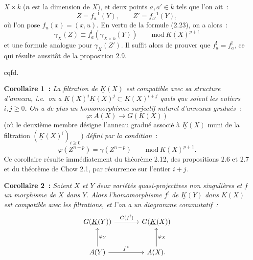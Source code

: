 $X\times k$ ($n$ est la
dimension de $X$), et deux points $a,a'\in k$ tels que l'on ait~:
\[
 Z=f_a^{-1}(Y),\qquad Z'=f_{a'}^{-1}(Y),
\]
où l'on pose $f_u(x)=(x,u)$. En vertu de la formule (2.23), on a alors~:
\[
 \gamma_X(Z)\equiv f_a^!(\gamma_{X\times k}(Y))\qquad\mathrm{mod}\ \underline K(X)^{p+1}
\]
et une formule analogue pour $\gamma_X(Z')$. Il suffit alors de prouver que $f_a^!=f_a^!$, ce qui résulte aussitôt de la proposition 2.9.
\begin{flushright}cqfd.\end{flushright}

\textbf{Corollaire 1~:} \emph{La filtration de $\underline K(X)$ est compatible avec sa structure d'anneau, i.e.\ on a $\underline K(X)^i\underline K(X)^j\subset\underline K(X)^{i+j}$ quels que soient les entiers $i,j\geq0$. On a de plus un homomorphisme surjectif naturel d'anneaux gradués~:}
\begin{equation}\tag{2.34}
 \varphi:A(X)\longrightarrow G(K(X))
\end{equation}
(où le deuxième membre désigne l'anneau gradué associé à $\underline K(X)$ muni de la filtration $(\underline K(X)^i)_{i\geq0}$) \emph{défini par la condition}~:
\[
 \varphi(Z^{n-p})=\gamma(Z^{n-p})\qquad\mathrm{mod}\ \underline K(X)^{p+1}.
\]
Ce corollaire résulte immédiatement du théorème 2.12, des propositions 2.6 et 2.7 et du théorème de Chow 2.1, par récurrence sur l'entier $i+j$.

\textbf{Corollaire 2~:} \emph{Soient $X$ et $Y$ deux variétés quasi-projectives non singulières et $f$ un morphisme de $X$ dans $Y$. Alors l'homomorphisme $f^!$ de $\underline K(Y)$ dans $K(X)$ est compatible avec les filtrations, et l'on a un diagramme commutatif~:}
\[
\begin{tikzcd}[column sep=large,row sep=large]
G(\underline K(Y)) \arrow[r,"G(f^!)"] & G(\underline K(X))\\
A(Y) \arrow[r,"f^*"] \arrow[u,"\varphi_Y"'] & A(X) \arrow[u,"\varphi_X"'] .
\end{tikzcd}
\]
